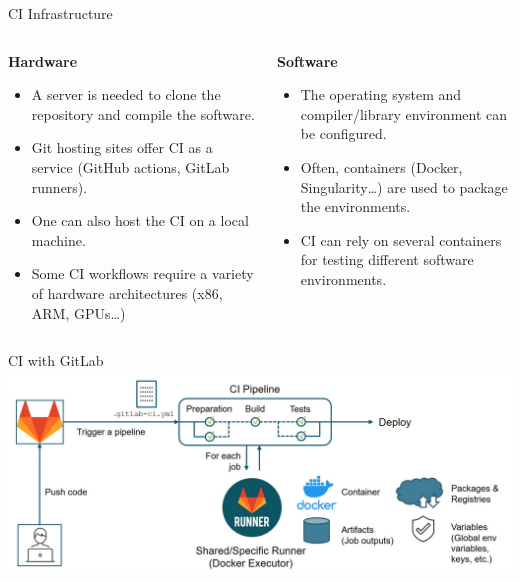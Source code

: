 \documentclass{setbeamer}
\begin{document}
\begin{frame}[c]{CI Infrastructure}
    \begin{columns}[T]
        \begin{column}{0.5\textwidth}
            \textbf{Hardware}\\
            \begin{itemize}
            \item 
            A server is needed to clone the repository and compile the software.
            \item
            Git hosting sites offer CI as a service (GitHub actions, GitLab runners).
            \item 
            One can also host the CI on a local machine.
            \item 
            Some CI workflows require a variety of hardware architectures (x86, ARM, GPUs\dots)
            \end{itemize}
        \end{column}

        \begin{column}{0.5\textwidth}
            \textbf{Software}\\
            \begin{itemize}
            \item 
            The operating system and compiler/library environment can be configured.
            \item
            Often, containers (Docker, Singularity\dots) are used to package the environments.
            \item 
            CI can rely on several containers for testing different software environments.
            \end{itemize}
        \end{column}
    \end{columns}
\end{frame}

\begin{frame}[c]{CI with GitLab}
	\centering
    \includegraphics[width=15cm]{resources/ci-gitlab}
\end{frame}
\end{document}
